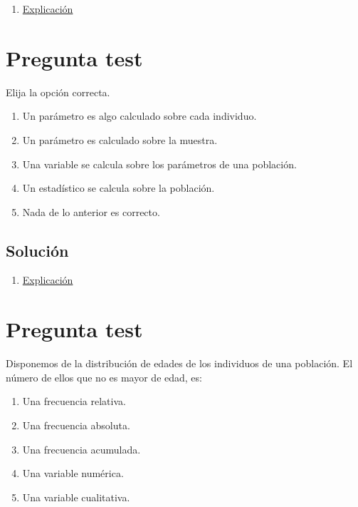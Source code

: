 \documentclass[
]{book}
\providecommand{\tightlist}{%
  \setlength{\itemsep}{0pt}\setlength{\parskip}{0pt}}
\begin{document}
\begin{enumerate}
\def\labelenumi{\alph{enumi})}
\setcounter{enumi}{2}
\tightlist
\item
  \href{https://1fjmanzano.github.io/bioestadistica/tipos-de-variables.html}{Explicación}
\end{enumerate}

\hypertarget{pregunta-test-8}{%
\section{Pregunta test}\label{pregunta-test-8}}

Elija la opción correcta.

\begin{enumerate}
\def\labelenumi{\alph{enumi})}
\tightlist
\item
  Un parámetro es algo calculado sobre cada individuo.
\item
  Un parámetro es calculado sobre la muestra.
\item
  Una variable se calcula sobre los parámetros de una población.
\item
  Un estadístico se calcula sobre la población.
\item
  Nada de lo anterior es correcto.
\end{enumerate}

\hypertarget{soluciuxf3n-10}{%
\subsection{Solución}\label{soluciuxf3n-10}}

\begin{enumerate}
\def\labelenumi{\alph{enumi})}
\setcounter{enumi}{4}
\tightlist
\item
  \href{https://1fjmanzano.github.io/bioestadistica/conceptos-previos.html}{Explicación}
\end{enumerate}

\hypertarget{pregunta-test-9}{%
\section{Pregunta test}\label{pregunta-test-9}}

Disponemos de la distribución de edades de los individuos de una población. El número de ellos que no es mayor de edad, es:

\begin{enumerate}
\def\labelenumi{\alph{enumi})}
\tightlist
\item
  Una frecuencia relativa.
\item
  Una frecuencia absoluta.
\item
  Una frecuencia acumulada.
\item
  Una variable numérica.
\item
  Una variable cualitativa.
\end{enumerate}
\end{document}
